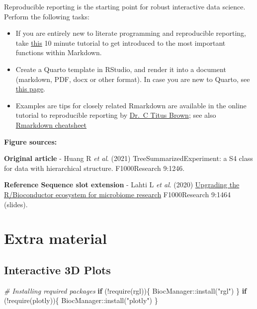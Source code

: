 \documentclass[
]{book}
\newenvironment{Shaded}{\begin{snugshade}}{\end{snugshade}}
\newcommand{\CommentTok}[1]{\textcolor[rgb]{0.56,0.35,0.01}{\textit{#1}}}
\newcommand{\ControlFlowTok}[1]{\textcolor[rgb]{0.13,0.29,0.53}{\textbf{#1}}}
\newcommand{\FunctionTok}[1]{\textcolor[rgb]{0.00,0.00,0.00}{#1}}
\newcommand{\NormalTok}[1]{#1}
\newcommand{\SpecialCharTok}[1]{\textcolor[rgb]{0.00,0.00,0.00}{#1}}
\newcommand{\StringTok}[1]{\textcolor[rgb]{0.31,0.60,0.02}{#1}}
\begin{document}
Reproducible reporting is the starting point for robust interactive
data science. Perform the following tasks:

\begin{itemize}
\item
  If you are entirely new to literate programming and reproducible
  reporting, take \href{https://www.markdowntutorial.com/}{this} 10 minute
  tutorial to get introduced to the most important functions within
  Markdown.
\item
  Create a Quarto template in RStudio, and render it into a
  document (markdown, PDF, docx or other format). In case you are new
  to Quarto, see \href{https://quarto.org/}{this page}.
\item
  Examples are tips for closely related Rmarkdown are available in
  the online tutorial to reproducible reporting by \href{https://rpubs.com/marschmi/RMarkdown}{Dr.~C Titus
  Brown}; see also \href{https://www.rstudio.com/wp-content/uploads/2015/02/rmarkdown-cheatsheet.pdf}{Rmarkdown
  cheatsheet}
\end{itemize}

\textbf{Figure sources:}

\textbf{Original article}
- Huang R \emph{et al}. (2021) TreeSummarizedExperiment: a S4 class
for data with hierarchical structure. F1000Research 9:1246. \citep{Huang2021}

\textbf{Reference Sequence slot extension}
- Lahti L \emph{et al}. (2020) \href{https://doi.org/10.7490/\%20f1000research.1118447.1}{Upgrading the R/Bioconductor ecosystem for microbiome
research} F1000Research 9:1464 (slides).

\hypertarget{extras}{%
\chapter{Extra material}\label{extras}}

\hypertarget{interactive-3d-plots}{%
\section{Interactive 3D Plots}\label{interactive-3d-plots}}

\begin{Shaded}
\begin{Highlighting}[]
\CommentTok{\# Installing required packages}
\ControlFlowTok{if}\NormalTok{ (}\SpecialCharTok{!}\FunctionTok{require}\NormalTok{(rgl))\{}
\NormalTok{  BiocManager}\SpecialCharTok{::}\FunctionTok{install}\NormalTok{(}\StringTok{"rgl"}\NormalTok{)  }
\NormalTok{\}}
\ControlFlowTok{if}\NormalTok{ (}\SpecialCharTok{!}\FunctionTok{require}\NormalTok{(plotly))\{}
\NormalTok{  BiocManager}\SpecialCharTok{::}\FunctionTok{install}\NormalTok{(}\StringTok{"plotly"}\NormalTok{)  }
\NormalTok{\}}
\end{Highlighting}
\end{Shaded}
\end{document}
